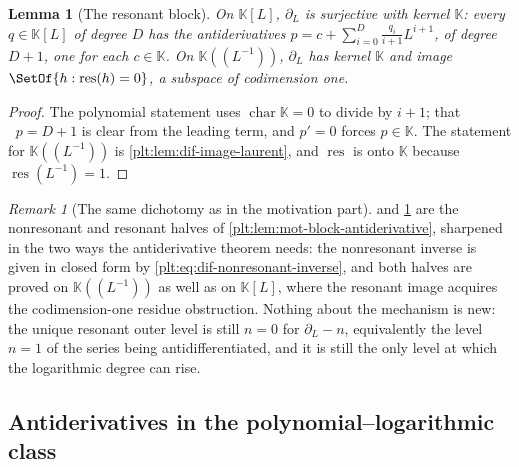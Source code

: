 \documentclass[11pt,oneside]{article}
\theoremstyle{plain}
\newtheorem{lemma}[theorem]{Lemma}
\theoremstyle{definition}
\theoremstyle{remark}
\newtheorem{remark}[theorem]{Remark}
\newcommand{\K}{\mathbb{K}}
\DeclareMathOperator{\degL}{deg_{L}}
\begin{document}
\begin{lemma}[The resonant block]\label{plt:lem:dif-resonant}
On \(\K[L]\), \(\partial_{L}\) is surjective with kernel \(\K\): every
\(q\in\K[L]\) of degree \(D\) has the antiderivatives
\(p=c+\sum_{i=0}^{D}\frac{q_{i}}{i+1}L^{i+1}\), of degree \(D+1\), one for each
\(c\in\K\).  On \(\K((L^{-1}))\), \(\partial_{L}\) has kernel \(\K\) and image
\(\SetOf{h:\operatorname{res}(h)=0}\), a subspace of codimension one.
\end{lemma}

\begin{proof}
The polynomial statement uses \(\operatorname{char}\K=0\) to divide by
\(i+1\); that \(\degL p=D+1\) is clear from the leading term, and \(p'=0\)
forces \(p\in\K\).  The statement for \(\K((L^{-1}))\) is
\cref{plt:lem:dif-image-laurent}, and \(\operatorname{res}\) is onto \(\K\)
because \(\operatorname{res}(L^{-1})=1\).
\end{proof}

\begin{remark}[The same dichotomy as in the motivation part]
\label{plt:rmk:dif-resonance-restated}
 and \cref{plt:lem:dif-resonant} are the
nonresonant and resonant halves of
\cref{plt:lem:mot-block-antiderivative}, sharpened in the two ways the
antiderivative theorem needs: the nonresonant inverse is given in closed form
by \cref{plt:eq:dif-nonresonant-inverse}, and both halves are proved on
\(\K((L^{-1}))\) as well as on \(\K[L]\), where the resonant image acquires
the codimension-one residue obstruction.  Nothing about the mechanism is new:
the unique resonant outer level is still \(n=0\) for \(\partial_{L}-n\),
equivalently the level \(n=1\) of the series being antidifferentiated, and it
is still the only level at which the logarithmic degree can rise.
\end{remark}

\subsection{Antiderivatives in the polynomial--logarithmic class}
\label{plt:sec:dif-antiderivative}
\end{document}
